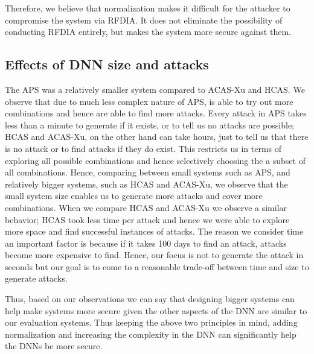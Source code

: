 Therefore, we believe that normalization makes it difficult for the attacker to compromise the system via \ac{RFDIA}. 
It does not eliminate the possibility of conducting \ac{RFDIA} entirely, but makes the system more secure against them. 

\subsection{Effects of DNN size and attacks}
The \ac{APS} was a relatively smaller system compared to \ac{ACAS-Xu} and \ac{HCAS}.
We observe that due to much less complex nature of \ac{APS}, \tool is able to try out more combinations and hence are able to find more attacks. 
Every attack in \ac{APS} takes less than a minute to generate if it exists, or to tell us no attacks are possible; 
\ac{HCAS} and \ac{ACAS-Xu}, on the other hand can take hours, just to tell us that there is no attack or to find attacks if they do exist.
This restricts us in terms of exploring all possible combinations and hence selectively choosing the a subset of all combinations. 
Hence, comparing between small systems such as \ac{APS}, and relatively bigger systems, such as \ac{HCAS} and \ac{ACAS-Xu}, we observe that the small system size enables us to generate more attacks and cover more combinations. 
When we compare \ac{HCAS} and \ac{ACAS-Xu} we observe a similar behavior; \ac{HCAS} took less time per attack and hence we were able to explore more space and find successful instances of attacks. 
The reason we consider time an important factor is because if it takes 100 days to find an attack, attacks become more expensive to find. 
Hence, our focus is not to generate the attack in seconds but our goal is to come to a reasonable trade-off between time and size to generate attacks. 

Thus, based on our observations we can say that designing bigger systems can help make systems more secure given the other aspects of the \ac{DNN} are similar to our evaluation systems. 
\newline
\newline 
\newline 
Thus keeping the above two principles in mind, adding normalization and increasing the complexity in the \ac{DNN} can significantly help the \ac{DNN}s be more secure. 


